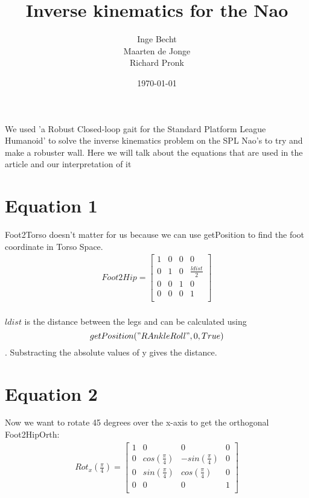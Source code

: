 \documentclass[a4paper]{article}
\begin{document}
\title{Inverse kinematics for the Nao}
\author{Inge Becht \\ Maarten de Jonge \\ Richard Pronk}
\date{\today}
\maketitle

We used 'a Robust Closed-loop gait for the Standard Platform League Humanoid' to
solve the inverse kinematics problem on the SPL Nao's to try and make a robuster
wall. Here we will talk about the equations that are used in the article and our
interpretation of it

\section*{Equation 1}
Foot2Torso doesn't matter for us because we can use getPosition to find the foot
coordinate in Torso Space.
\begin{align*}    
Foot2Hip = 
\begin{bmatrix}
    1 & 0 & 0 & 0 \\
    0 & 1 & 0 & \frac{ldist}{2}\\
    0 & 0 & 1 & 0 \\
    0 & 0 & 0 & 1 \\
\end{bmatrix}\\
\end{align*}

$ldist$ is the distance between the legs and can be calculated using 
\[getPosition("RAnkleRoll", 0 , True)\]. Substracting the absolute values of y
gives the distance.

\section*{Equation 2}
Now we want to rotate 45 degrees over the x-axis to get the orthogonal
Foot2HipOrth:
\begin{align*}
    Rot_x(\frac{\pi}{4})=
    \begin{bmatrix}
    1&0&0&0\\
    0&cos(\frac{\pi}{4})&-sin(\frac{\pi}{4})&0\\
    0&sin(\frac{\pi}{4})&cos(\frac{\pi}{4})&0\\
    0&0&0&1\\
    \end{bmatrix}
\end{align*}
\end{document}
